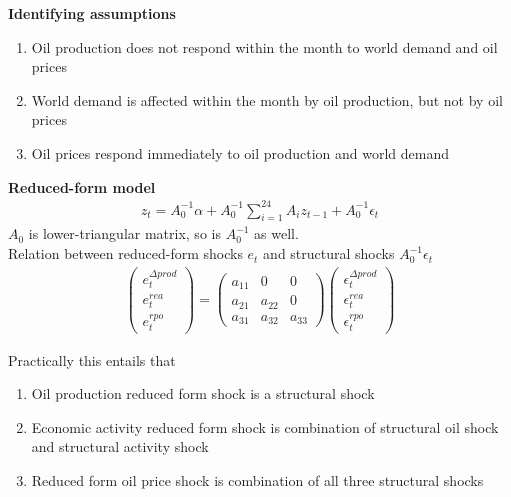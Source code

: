\documentclass{beamer}
\begin{document}
\begin{frame}
  \textbf{Identifying assumptions}
  \begin{enumerate}
  \item Oil production does not respond within the month to world demand and oil prices
  \item World demand is affected within the month by oil production, but not by oil prices
  \item Oil prices respond immediately to oil production and world demand
\end{enumerate}
\end{frame}

\begin{frame}
   \textbf{Reduced-form model}
    \begin{align*}
      z_t = A_0^{-1}\alpha + A_0^{-1} \sum_{i=1}^{24} A_i z_{t-1} + A_0^{-1} \epsilon_t
    \end{align*}
  $A_0$ is lower-triangular matrix, so is $A_0^{-1}$ as well.\\
  Relation between reduced-form shocks $e_t$ and structural shocks $A_0^{-1} \epsilon_t$
    \begin{align*}
      \begin{pmatrix}       e_t^{\Delta prod} \\ e_t^{rea}  \\ e_t^{rpo}      \end{pmatrix}
      =
      \begin{pmatrix}
        a_{11} & 0 & 0 \\
        a_{21} & a_{22} & 0\\
        a_{31} & a_{32} & a_{33}
      \end{pmatrix}
      \begin{pmatrix}       \epsilon_t^{\Delta prod} \\ \epsilon_t^{rea} \\ \epsilon_t^{rpo}      \end{pmatrix}
    \end{align*}
\end{frame}


\begin{frame}
  Practically this entails that 
\begin{enumerate}
  \item Oil production reduced form shock is a structural shock
  \item Economic activity reduced form shock is combination of structural oil shock and structural activity shock
  \item Reduced form oil price shock is combination of all three structural shocks
\end{enumerate}

\end{frame}
\end{document}
